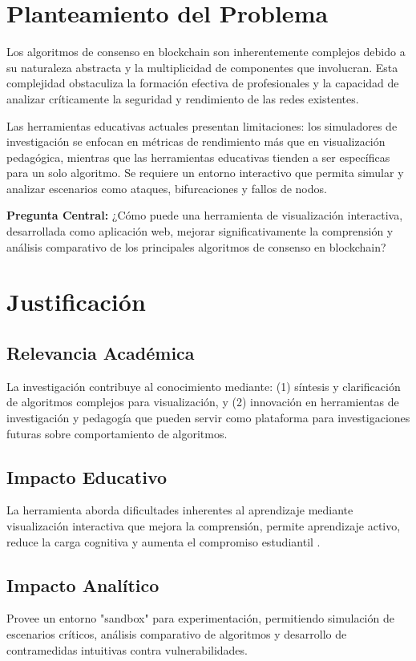 \documentclass[spanish,12pt,letterpaper]{report}
\begin{document}
\section{Planteamiento del Problema}
Los algoritmos de consenso en blockchain son inherentemente complejos debido a su naturaleza abstracta y la multiplicidad de componentes que involucran. Esta complejidad obstaculiza la formación efectiva de profesionales y la capacidad de analizar críticamente la seguridad y rendimiento de las redes existentes.

Las herramientas educativas actuales presentan limitaciones: los simuladores de investigación se enfocan en métricas de rendimiento más que en visualización pedagógica, mientras que las herramientas educativas tienden a ser específicas para un solo algoritmo. Se requiere un entorno interactivo que permita simular y analizar escenarios como ataques, bifurcaciones y fallos de nodos.

\textbf{Pregunta Central:} ¿Cómo puede una herramienta de visualización interactiva, desarrollada como aplicación web, mejorar significativamente la comprensión y análisis comparativo de los principales algoritmos de consenso en blockchain?

\section{Justificación}
\subsection{Relevancia Académica}
La investigación contribuye al conocimiento mediante: (1) síntesis y clarificación de algoritmos complejos para visualización, y (2) innovación en herramientas de investigación y pedagogía que pueden servir como plataforma para investigaciones futuras sobre comportamiento de algoritmos.

\subsection{Impacto Educativo}
La herramienta aborda dificultades inherentes al aprendizaje mediante visualización interactiva que mejora la comprensión, permite aprendizaje activo, reduce la carga cognitiva y aumenta el compromiso estudiantil \parencite{researchgate2018towards, stanford2025rodger}.

\subsection{Impacto Analítico}
Provee un entorno "sandbox" para experimentación, permitiendo simulación de escenarios críticos, análisis comparativo de algoritmos y desarrollo de contramedidas intuitivas contra vulnerabilidades.
\end{document}
